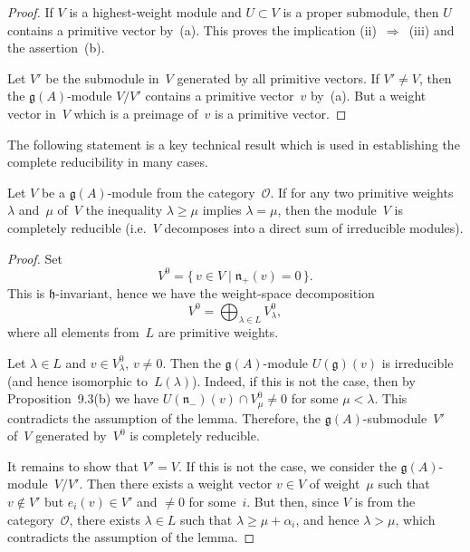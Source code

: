 \documentclass[12pt]{article}
\begin{document}
\begin{proposition}[9.3]
\begin{proof}
        If $V$ is a highest-weight module and $U \subset V$ is a proper submodule,
        then $U$ contains a primitive vector by~(a).
        This proves the implication \textup{(ii)}~$\Rightarrow$~\textup{(iii)} and the assertion~(b).

        Let $V'$ be the submodule in~$V$ generated by all primitive vectors.
        If $V' \ne V$, then the $\mathfrak{g}(A)$-module $V/V'$ contains a primitive vector~$v$ by~(a).
        But a weight vector in~$V$ which is a preimage of~$v$ is a primitive vector.
    \end{proof}
\end{proposition}

The following statement is a key technical result which is used in establishing the complete reducibility in many cases.
\begin{lemma}[9.5]
    Let $V$ be a $\mathfrak{g}(A)$-module from the category~$\mathcal{O}$.
    If for any two primitive weights $\lambda$ and~$\mu$ of~$V$
    the inequality $\lambda \ge \mu$ implies $\lambda = \mu$,
    then the module~$V$ is completely reducible
    (i.e.\ $V$ decomposes into a direct sum of irreducible modules).
\end{lemma}

\begin{proof}
    Set
    \[
        V^0 = \{\,v \in V \mid \mathfrak{n}_+(v) = 0\,\}.
    \]
    This is $\mathfrak{h}$-invariant, hence we have the weight-space decomposition
    \[
        V^0 = \bigoplus_{\lambda \in L} V^0_\lambda,
    \]
    where all elements from~$L$ are primitive weights.

    Let $\lambda \in L$ and $v \in V^0_\lambda$, $v \ne 0$.
    Then the $\mathfrak{g}(A)$-module $U(\mathfrak{g})(v)$ is irreducible
    (and hence isomorphic to~$L(\lambda)$).
    Indeed, if this is not the case, then by Proposition~9.3(b) we have
    $U(\mathfrak{n}_-)(v) \cap V^0_\mu \ne 0$ for some $\mu < \lambda$.
    This contradicts the assumption of the lemma.
    Therefore, the $\mathfrak{g}(A)$-submodule~$V'$ of~$V$ generated by~$V^0$
    is completely reducible.

    It remains to show that $V' = V$.
    If this is not the case, we consider the $\mathfrak{g}(A)$-module~$V/V'$.
    Then there exists a weight vector $v \in V$ of weight~$\mu$
    such that $v \notin V'$ but $e_i(v) \in V'$ and $\ne 0$ for some~$i$.
    But then, since $V$ is from the category~$\mathcal{O}$,
    there exists $\lambda \in L$ such that $\lambda \ge \mu + \alpha_i$,
    and hence $\lambda > \mu$, which contradicts the assumption of the lemma.
\end{proof}
\end{document}
